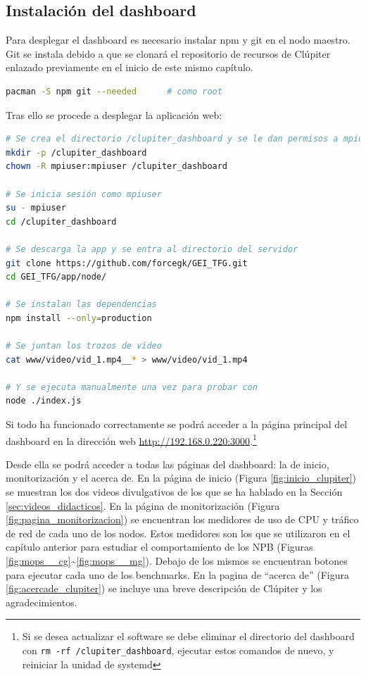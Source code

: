 \subsection{Instalación del dashboard}
Para desplegar el dashboard es necesario instalar npm y git en el nodo maestro. Git se instala debido a que se clonará el repositorio de recursos de Clúpiter enlazado previamente en el inicio de este mismo capítulo.
\begin{lstlisting}[language=bash]
pacman -S npm git --needed      # como root
\end{lstlisting}

Tras ello se procede a desplegar la aplicación web:
\begin{lstlisting}[language=bash]
# Se crea el directorio /clupiter_dashboard y se le dan permisos a mpiuser
mkdir -p /clupiter_dashboard
chown -R mpiuser:mpiuser /clupiter_dashboard

# Se inicia sesión como mpiuser
su - mpiuser
cd /clupiter_dashboard

# Se descarga la app y se entra al directorio del servidor
git clone https://github.com/forcegk/GEI_TFG.git
cd GEI_TFG/app/node/

# Se instalan las dependencias
npm install --only=production

# Se juntan los trozos de vídeo
cat www/video/vid_1.mp4__* > www/video/vid_1.mp4

# Y se ejecuta manualmente una vez para probar con
node ./index.js
\end{lstlisting}

Si todo ha funcionado correctamente se podrá acceder a la página principal del dashboard en la dirección web \url{http://192.168.0.220:3000}.\footnote{Si se desea actualizar el software se debe eliminar el directorio del dashboard con \texttt{rm -rf /clupiter\_dashboard}, ejecutar estos comandos de nuevo, y reiniciar la unidad de systemd} 

Desde ella se podrá acceder a todas las páginas del dashboard: la de inicio, monitorización y el acerca de. En la página de inicio (Figura \ref{fig:inicio_clupiter}) se muestran los dos videos divulgativos de los que se ha hablado en la Sección \ref{sec:videos_didacticos}. En la página de monitorización (Figura \ref{fig:pagina_monitorizacion}) se encuentran los medidores de uso de CPU y tráfico de red de cada uno de los nodos. Estos medidores son los que se utilizaron en el capítulo anterior para estudiar el comportamiento de los NPB (Figuras \ref{fig:mops__cg}\textasciitilde\ref{fig:mops__mg}). Debajo de los mismos se encuentran botones para ejecutar cada uno de los benchmarks. En la pagina de ``acerca de'' (Figura \ref{fig:acercade_clupiter}) se incluye una breve descripción de Clúpiter y los agradecimientos. 


